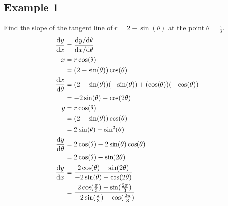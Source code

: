 \documentclass{math}
\begin{document}
\subsection*{Example 1}
Find the slope of the tangent line of \( r = 2-\sin(\theta) \) at the point
\( \theta = \frac{\pi}{3} \).
\begin{align*}
  \frac{\mathrm{d}{y}}{\mathrm{d}{x}} &=
    \frac{\mathrm{d}{y}/\mathrm{d}{\theta}}{\mathrm{d}{x}/\mathrm{d}{\theta}} \\
  x &= r\cos(\theta) \\
  &= (2-\sin(\theta))\cos(\theta) \\
  \frac{\mathrm{d}{x}}{\mathrm{d}{\theta}} &= (2-\sin(\theta))(-\sin(\theta))+
    (\cos(\theta))(-\cos(\theta)) \\
  &= -2\sin(\theta)-\cos(2\theta) \\
  y &= r\cos(\theta) \\
  &= (2-\sin(\theta))\cos(\theta) \\
  &= 2\sin(\theta)-\sin^{2}(\theta) \\
  \frac{\mathrm{d}{y}}{\mathrm{d}{\theta}} &= 2\cos(\theta)-2\sin(\theta)\cos(\theta) \\
  &= 2\cos(\theta)-\sin(2\theta) \\
  \frac{\mathrm{d}{y}}{\mathrm{d}{x}} &=
    \frac{2\cos(\theta)-\sin(2\theta)}{-2\sin(\theta)-\cos(2\theta)} \\
  &= \frac{2\cos(\frac{\pi}{3})-\sin(\frac{2\pi}{3})}
    {-2\sin(\frac{\pi}{3})-\cos(\frac{2\pi}{3})} \\
\end{align*}
\end{document}
